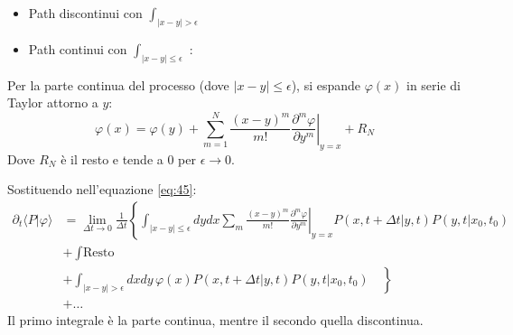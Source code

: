 \begin{itemize}
    \item Path discontinui con  $\int_{|x-y| > \epsilon}$
    \item Path continui con  $\int_{|x-y| \le \epsilon}$  :
\end{itemize}

Per la parte continua del processo (dove $|x-y| \le \epsilon$), si espande $\varphi(x)$ in serie di Taylor attorno a $y$:
\begin{equation}
\varphi(x) = \varphi(y) + \sum_{m=1}^{N} \frac{(x-y)^m}{m!} \left. \frac{\partial^m \varphi}{\partial y^m} \right|_{y=x} + R_N
\end{equation}
Dove $R_N$ è il resto e tende a 0 per $\epsilon \to 0$.

Sostituendo nell'equazione \ref{eq:45}:
\begin{align*}
\partial_t \langle P | \varphi \rangle &= \lim_{\Delta t \to 0} \frac{1}{\Delta t} \left\{ \int_{|x-y|\le\epsilon} dy dx \sum_m \frac{(x-y)^m}{m!} \left. \frac{\partial^m \varphi}{\partial y^m} \right|_{y=x} P(x,t+\Delta t|y,t) P(y,t|x_0,t_0) \right. \\
&+ \left. \int \text{Resto} \right. \\  &+ \left. \int_{|x-y|>\epsilon} dx dy \, \varphi(x) P(x,t+\Delta t|y,t) P(y,t|x_0,t_0) \quad \right\} \\ &+ \dots 
\end{align*}
Il primo integrale è la parte continua, mentre il secondo quella discontinua.